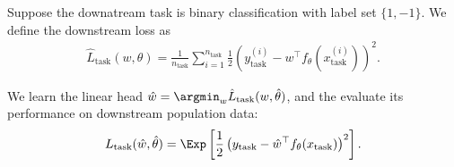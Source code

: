 Suppose the downatream task is binary classification with label set $\{1, -1\}$. We define the downstream loss as 
\begin{align}
	\hat{L}_{\text{task}}(w, \theta) = \frac{1}{n_{\text{task}}} \sum_{i=1}^{n_{\text{task}}} \frac{1}{2} \left(y^{(i)}_{\text{task}} - w^\top f_{{\theta}}(x^{(i)}_{\text{task}})\right)^2.
\end{align}

We learn the linear head $\hat{w} = \argmin_w \hat{L}_{\text{task}}(w, \hat{\theta})$, and the evaluate its performance on downstream population data:
\begin{align}
	L_{\text{task}}(\hat{w}, \hat{\theta}) = \Exp\left[\frac{1}{2} \left(y_{\text{task}} - \hat{w}^\top f_{{\theta}}(x_{\text{task}})\right)^2\right].
\end{align}

